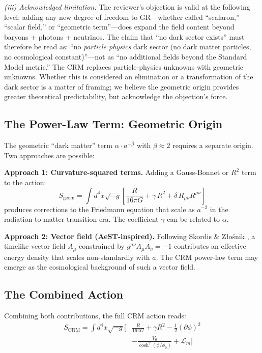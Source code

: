 \documentclass[aps,prd,twocolumn,superscriptaddress,nofootinbib]{revtex4-2}
\begin{document}
\textit{(iii) Acknowledged limitation:} The reviewer's objection is valid at the following level: adding any new degree of freedom to GR---whether called ``scalaron,'' ``scalar field,'' or ``geometric term''---does expand the field content beyond baryons + photons + neutrinos. The claim that ``no dark sector exists'' must therefore be read as: ``no \textit{particle physics} dark sector (no dark matter particles, no cosmological constant)''---not as ``no additional fields beyond the Standard Model metric.'' The CRM replaces particle-physics unknowns with geometric unknowns. Whether this is considered an elimination or a transformation of the dark sector is a matter of framing; we believe the geometric origin provides greater theoretical predictability, but acknowledge the objection's force.

\subsection{The Power-Law Term: Geometric Origin}
\label{subsec:powerlaw_lagrangian}

The geometric ``dark matter'' term $\alpha \cdot a^{-\beta}$ with $\beta \approx 2$ requires a separate origin. Two approaches are possible:

\textbf{Approach 1: Curvature-squared terms.} Adding a Gauss-Bonnet or $R^2$ term to the action:
\begin{equation}
S_{\mathrm{geom}} = \int d^4x \sqrt{-g} \left[\frac{R}{16\pi G} + \gamma\, R^2 + \delta\, R_{\mu\nu}R^{\mu\nu}\right]
\end{equation}
produces corrections to the Friedmann equation that scale as $a^{-2}$ in the radiation-to-matter transition era. The coefficient $\gamma$ can be related to $\alpha$.

\textbf{Approach 2: Vector field (AeST-inspired).} Following Skordis \& Z{\l}o\'snik \cite{Skordis2021}, a timelike vector field $A_\mu$ constrained by $g^{\mu\nu}A_\mu A_\nu = -1$ contributes an effective energy density that scales non-standardly with $a$. The CRM power-law term may emerge as the cosmological background of such a vector field.

\subsection{The Combined Action}
\label{subsec:combined_action}

Combining both contributions, the full CRM action reads:
\begin{equation}
\begin{split}
S_{\mathrm{CRM}} = \int d^4x \sqrt{-g} \Big[&\frac{R}{16\pi G} + \gamma R^2 - \frac{1}{2}(\partial\phi)^2 \\
&- \frac{V_0}{\cosh^2(\phi/\phi_0)} + \mathcal{L}_m\Big]
\end{split}
\label{eq:full_action}
\end{equation}
\end{document}
